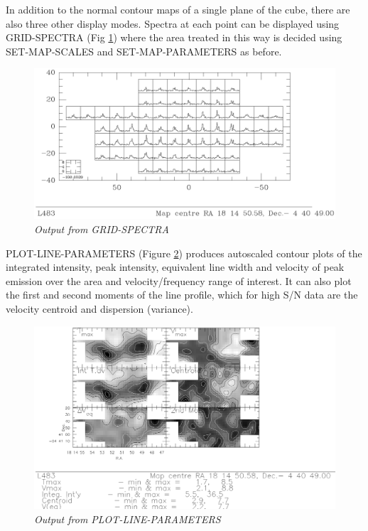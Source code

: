 \documentclass[11pt,twoside]{report}
\begin{document}
In addition to the normal contour maps of a single plane of the cube, there are
also three other display modes. Spectra at each point can be displayed using
GRID-SPECTRA (Fig \ref{GRID}) where the area treated in this way is decided
using SET-MAP-SCALES and SET-MAP-PARAMETERS as before.
\begin{figure}[htbp]
\begin{center}
\includegraphics[scale=0.65]{grid-spec.ps}
\protect\parbox{5.5in}
{\caption[GRID]
{\sl
Output from GRID-SPECTRA
\label{GRID}
}
}
\end{center}
\end{figure}

PLOT-LINE-PARAMETERS (Figure \ref{PLP}) produces autoscaled contour plots of
the integrated intensity, peak intensity, equivalent line width and velocity of
peak emission over the area and velocity/frequency range of interest. It can
also plot the first and second moments of the line profile, which for high
S/N data are the velocity centroid and dispersion (variance).
\begin{figure}[htbp]
\begin{center}
\includegraphics[scale=0.8]{plot-l-p.ps}
\protect\parbox{5.5in}
{\caption[PLP]
{\sl
Output from PLOT-LINE-PARAMETERS
\label{PLP}
}
}
\end{center}
\end{figure}
\end{document}
